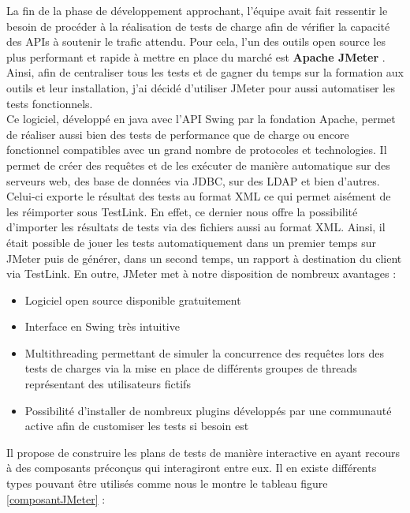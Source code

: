 	La fin de la phase de développement approchant, l’équipe avait fait ressentir le besoin de procéder à la réalisation de tests de charge afin de vérifier la capacité des APIs à soutenir le trafic attendu. Pour cela, l’un des outils open source les plus performant et rapide à mettre en place du marché est \textbf{Apache JMeter} \cite{bib_jmeter}. Ainsi, afin de centraliser tous les tests et de gagner du temps sur la formation aux outils et leur installation, j’ai décidé d’utiliser JMeter pour aussi automatiser les tests fonctionnels. \\
	
	Ce logiciel, développé en java avec l’API Swing par la fondation Apache, permet de réaliser aussi bien des tests de performance que de charge ou encore fonctionnel compatibles avec un grand nombre de protocoles et technologies. Il permet de créer des requêtes et de les exécuter de manière automatique sur des serveurs web, des base de données via JDBC, sur des LDAP et bien d’autres. Celui-ci exporte le résultat des tests au format XML ce qui permet aisément de les réimporter sous TestLink. En effet, ce dernier nous offre la possibilité d’importer les résultats de tests via des fichiers aussi au format XML. Ainsi, il était possible de jouer les tests automatiquement dans un premier temps sur JMeter puis de générer, dans un second temps,  un rapport à destination du client via TestLink. En outre, JMeter met à notre disposition de nombreux avantages : \\
	
\begin{itemize}
	\item Logiciel open source disponible gratuitement
	\item Interface en Swing très intuitive
	\item Multithreading permettant de simuler la concurrence des requêtes lors des tests de charges via la mise en place de différents groupes de threads représentant des utilisateurs fictifs
	\item Possibilité d’installer de nombreux plugins développés par une communauté active afin de customiser les tests si besoin est \\
\end{itemize}
 
	Il propose de construire les plans de tests de manière interactive en ayant recours à des composants préconçus qui interagiront entre eux. Il en existe différents types pouvant être utilisés comme nous le montre le tableau figure \ref{composantJMeter} : \\

